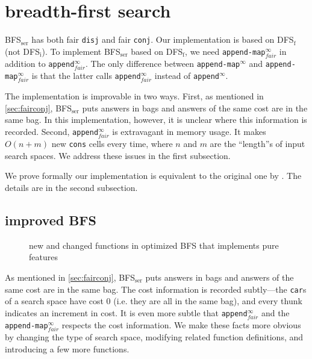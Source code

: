 \documentclass[format=acmlarge, review=true, authordraft=true]{acmart}
\newcommand{\conj}{\texttt{conj}}
\newcommand{\disj}{\texttt{disj}}
\newcommand{\DFSi }[0]{DFS$_\textrm{i}$}
\newcommand{\DFSf }[0]{DFS$_\textrm{f}$}
\newcommand{\BFSser}[0]{BFS$_\textrm{ser}$}
\begin{document}

\section{breadth-first search}

\BFSser{} has both fair \disj{} and fair \conj{}. Our implementation is based 
on \DFSf{} (not \DFSi{}). To implement \BFSser{} based on \DFSf{}, 
we need \texttt{append-map$^\infty_{fair}$} in addition to 
\texttt{append$^\infty_{fair}$}. 
The only difference between \texttt{append-map$^\infty$} and 
\texttt{append-map$^\infty_{fair}$} is that the latter calls 
\texttt{append$^\infty_{fair}$} instead of \texttt{append$^\infty$}.

The implementation is improvable in two ways. First, as mentioned in 
\autoref{sec:fairconj}, \BFSser{} puts answers in bags and answers of the same 
cost are in the 
same bag. In this implementation, however, it is unclear where this information 
is recorded. Second, \texttt{append$^\infty_{fair}$} is extravagant in memory 
usage. It 
makes $O(n+m)$ new \texttt{cons} cells every time, where $n$ and $m$ are the 
``length''s of input search spaces. We address these issues in the first 
subsection.


We prove formally our implementation is equivalent to the original one by 
\citet{seres1999algebra}. The details are in the second subsection.

\subsection{improved BFS}

\begin{figure}
		
	\caption{new and changed functions in optimized BFS that implements pure 
	features}
	\label{BFS-opt}
\end{figure}

As mentioned in \autoref{sec:fairconj}, \BFSser{} puts answers in bags and 
answers of the 
same cost are in the same bag. The cost
information is recorded subtly---the \texttt{car}s of a search space have cost 
0 (i.e. they are all in the same bag), and every thunk indicates an increment 
in cost. It is even more subtle that
\texttt{append$^\infty_{fair}$} and the \texttt{append-map$^\infty_{fair}$} 
respects the cost information. We make these facts more obvious by 
changing the type of search space, modifying related function definitions, 
and introducing a few more functions.
\end{document}
